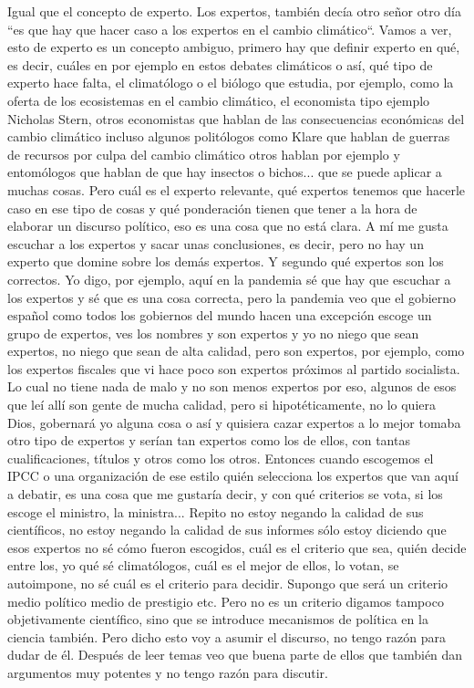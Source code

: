 Igual que el concepto de experto. Los expertos, también decía otro señor otro día ``es que hay que hacer caso a los expertos en el cambio climático``. Vamos a ver, esto de experto es un concepto ambiguo, primero hay que definir experto en qué, es decir, cuáles en por ejemplo en estos debates climáticos o así, qué tipo de experto hace falta, el climatólogo o el biólogo que estudia, por ejemplo, como la oferta de los ecosistemas en el cambio climático, el economista tipo ejemplo Nicholas Stern, otros economistas que hablan de las consecuencias económicas del cambio climático incluso algunos politólogos como Klare que hablan de guerras de recursos por culpa del cambio climático otros hablan por ejemplo y entomólogos que hablan de que hay insectos o bichos... que se puede aplicar a muchas cosas. Pero cuál es el experto relevante, qué expertos tenemos que hacerle caso en ese tipo de cosas y qué ponderación tienen que tener a la hora de elaborar un discurso político, eso es una cosa que no está clara. A mí me gusta escuchar a los expertos y sacar unas conclusiones, es decir, pero no hay un experto que domine sobre los demás expertos. Y segundo qué expertos son los correctos. Yo digo, por ejemplo, aquí en la pandemia sé que hay que escuchar a los expertos y sé que es una cosa correcta, pero la pandemia veo que el gobierno español como todos los gobiernos del mundo hacen una excepción escoge un grupo de expertos, ves los nombres y son expertos y yo no niego que sean expertos, no niego que sean de alta calidad, pero son expertos, por ejemplo, como los expertos fiscales que vi hace poco son expertos próximos al partido socialista. Lo cual no tiene nada de malo y no son menos expertos por eso, algunos de esos que leí allí son gente de mucha calidad, pero si hipotéticamente, no lo quiera Dios, gobernará yo alguna cosa o así y quisiera cazar expertos a lo mejor tomaba otro tipo de expertos y serían tan expertos como los de ellos, con tantas cualificaciones, títulos y otros como los otros. Entonces cuando escogemos el IPCC o una organización de ese estilo quién selecciona los expertos que van aquí a debatir, es una cosa que me gustaría decir, y con qué criterios se vota, si los escoge el ministro, la ministra... Repito no estoy negando la calidad de sus científicos, no estoy negando la calidad de sus informes sólo estoy diciendo que esos expertos no sé cómo fueron escogidos, cuál es el criterio que sea, quién decide entre los, yo qué sé climatólogos, cuál es el mejor de ellos, lo votan, se autoimpone, no sé cuál es el criterio para decidir. Supongo que será un criterio medio político medio de prestigio etc. Pero no es un criterio digamos tampoco objetivamente científico, sino que se introduce mecanismos de política en la ciencia también. Pero dicho esto voy a asumir el discurso, no tengo razón para dudar de él. Después de leer temas veo que buena parte de ellos que también dan argumentos muy potentes y no tengo razón para discutir.

